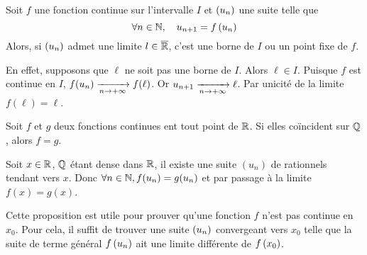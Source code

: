 \documentclass{magnolia}
\begin{document}
\begin{remarques}
\remarque Soit $f$ une fonction continue sur l'intervalle $I$ et $\left(u_n\right)$
  une suite telle que
  \[\forall n\in\mathbb{N} ,\quad u_{n+1}=f\left(u_n\right)\]
  Alors, si $\left(u_n\right)$ admet une limite $l\in\overline{\mathbb{R}}$, c'est une borne de
  $I$ ou un point fixe de $f$.
  \begin{sol}
  En effet, supposons que $\ell$ ne soit pas une borne de $I$.
  Alors $\ell \in I$. Puisque $f$ est continue en $I$, $f(u_n)\xrightarrow[n\rightarrow +\infty]{}f(\ell)$. Or $u_{n+1}\xrightarrow[n\rightarrow +\infty]{}\ell$. Par unicité de la limite $f(\ell)=\ell$.
  \end{sol}
\remarque Soit $f$ et $g$ deux fonctions continues ent tout point de $\mathbb{R}$. Si elles coïncident
  sur $\mathbb{Q}$, alors $f=g$.
  \begin{sol}
  Soit $x\in \mathbb{R}$, $\mathbb{Q}$ étant dense dans $\mathbb{R}$, il existe une suite $(u_n)$ de rationnels tendant vers $x$. Donc $\forall n\in \mathbb{N}, f(u_n)=g(u_n)$ et par passage à la limite $f(x)=g(x)$.
  \end{sol}
\remarque Cette proposition est utile pour prouver qu'une fonction $f$ n'est
  pas continue en $x_0$. Pour cela, il suffit de trouver une suite $\left(u_n\right)$
  convergeant vers $x_0$ telle que la suite de terme général $f\left(u_n\right)$ ait
  une limite différente de $f\left(x_0\right)$.
\end{remarques}
\end{document}
